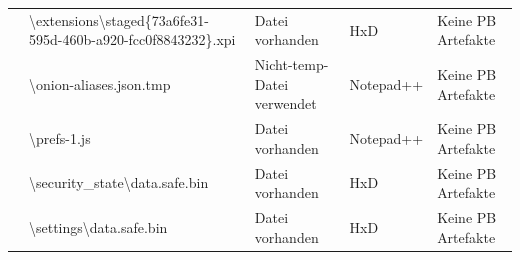 \begin{appendices}
{\begin{landscape}
\begin{table}[h!]
{\begin{tabular}{cllll}
							\multicolumn{1}{|c|}{}                                                                                        & \multicolumn{1}{l|}{\cellcolor[HTML]{3190FF}\textbackslash{}extensions\textbackslash{}staged\{73a6fe31-595d-460b-a920-fcc0f8843232\}.xpi}      & \multicolumn{1}{l|}{\cellcolor[HTML]{009901}Datei vorhanden}            & \multicolumn{1}{l|}{\cellcolor[HTML]{FFFFFF}HxD}                  & \multicolumn{1}{l|}{\cellcolor[HTML]{F8A102}Keine PB Artefakte} \\ \cline{2-5} 
							\multicolumn{1}{|c|}{}                                                                                        & \multicolumn{1}{l|}{\cellcolor[HTML]{3190FF}\textbackslash{}onion-aliases.json.tmp}                                                            & \multicolumn{1}{l|}{\cellcolor[HTML]{FCFF2F}Nicht-temp-Datei verwendet} & \multicolumn{1}{l|}{\cellcolor[HTML]{FFFFFF}Notepad++}            & \multicolumn{1}{l|}{\cellcolor[HTML]{F8A102}Keine PB Artefakte} \\ \cline{2-5} 
							\multicolumn{1}{|c|}{}                                                                                        & \multicolumn{1}{l|}{\cellcolor[HTML]{3190FF}\textbackslash{}prefs-1.js}                                                                        & \multicolumn{1}{l|}{\cellcolor[HTML]{009901}Datei vorhanden}            & \multicolumn{1}{l|}{\cellcolor[HTML]{FFFFFF}Notepad++}            & \multicolumn{1}{l|}{\cellcolor[HTML]{F8A102}Keine PB Artefakte} \\ \cline{2-5} 
							\multicolumn{1}{|c|}{}                                                                                        & \multicolumn{1}{l|}{\cellcolor[HTML]{3190FF}\textbackslash{}security\_state\textbackslash{}data.safe.bin}                                      & \multicolumn{1}{l|}{\cellcolor[HTML]{009901}Datei vorhanden}            & \multicolumn{1}{l|}{\cellcolor[HTML]{FFFFFF}HxD}                  & \multicolumn{1}{l|}{\cellcolor[HTML]{F8A102}Keine PB Artefakte} \\ \cline{2-5} 
							\multicolumn{1}{|c|}{}                                                                                        & \multicolumn{1}{l|}{\cellcolor[HTML]{3190FF}\textbackslash{}settings\textbackslash{}data.safe.bin}                                             & \multicolumn{1}{l|}{\cellcolor[HTML]{009901}Datei vorhanden}            & \multicolumn{1}{l|}{\cellcolor[HTML]{FFFFFF}HxD}                  & \multicolumn{1}{l|}{\cellcolor[HTML]{F8A102}Keine PB Artefakte} \\ \cline{2-5} 

\end{tabular}}
\end{table}
\end{landscape}}
\end{appendices}
